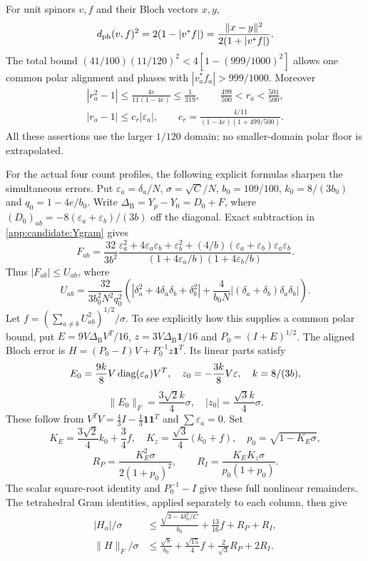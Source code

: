 For unit spinors $v,f$ and their Bloch vectors $x,y$,
\begin{equation}\label{app:candidate:spinor}
 d_{\rm ph}(v,f)^2=2(1-|v^*f|)
 =\frac{\|x-y\|^2}{2(1+|v^*f|)}.
\end{equation}
The total bound $(41/100)(11/120)^2<4[1-(999/1000)^2]$ allows one
common polar alignment and phases with $|v_a^*f_a|>999/1000$.
Moreover
\begin{gather*}
 |r_a^2-1|\le\frac{4e}{11(1-4e)}\le\frac1{319},\qquad
 \frac{499}{500}<r_a<\frac{501}{500},\\
 |r_a-1|\le c_r|\varepsilon_a|,
 \qquad c_r=\frac{4/11}{(1-4e)(1+499/500)}.
\end{gather*}
All these assertions use the larger $1/120$ domain; no smaller-domain
polar floor is extrapolated.

For the actual four count profiles, the following explicit formulas
sharpen the simultaneous errors. Put $\varepsilon_a=\delta_a/N$,
$\sigma=\sqrt C/N$, $b_0=109/100$, $k_0=8/(3b_0)$ and
$q_0=1-4e/b_0$. Write $\Delta_{\mathrm B}=Y_p-Y_0=D_0+F$, where
$(D_0)_{ab}=-8(\varepsilon_a+\varepsilon_b)/(3b)$ off the diagonal.
Exact subtraction in \eqref{app:candidate:Ygram} gives
\[
 F_{ab}=\frac{32}{3b^2}
 \frac{\varepsilon_a^2+4\varepsilon_a\varepsilon_b+\varepsilon_b^2
 +(4/b)(\varepsilon_a+\varepsilon_b)\varepsilon_a\varepsilon_b}
 {(1+4\varepsilon_a/b)(1+4\varepsilon_b/b)}.
\]
Thus $|F_{ab}|\le U_{ab}$, where
\[
 U_{ab}=\frac{32}{3b_0^2N^2q_0^2}
 \left(|\delta_a^2+4\delta_a\delta_b+\delta_b^2|
       +\frac4{b_0N}|(\delta_a+\delta_b)\delta_a\delta_b|\right).
\]
Let $f=(\sum_{a\ne b}U_{ab}^2)^{1/2}/\sigma$.
To see explicitly how this supplies a common polar bound, put
$E=9V\Delta_{\mathrm B}V^T/16$, $z=3V\Delta_{\mathrm B}\mathbf1/16$ and $P_0=(I+E)^{1/2}$.
The aligned Bloch error is
$H=(P_0-I)V+P_0^{-1}z\mathbf1^T$. Its linear parts satisfy
\[
 E_0=\frac{9k}{8}V\operatorname{diag}(\varepsilon_a)V^T,\quad
 z_0=-\frac{3k}{8}V\varepsilon,\quad k=8/(3b),
\]
\[
 \|E_0\|_F=\frac{3\sqrt2 k}{4}\sigma,
 \quad |z_0|=\frac{\sqrt3 k}{4}\sigma.
\]
These follow from $V^TV=\frac43I-\frac13\mathbf1\mathbf1^T$ and
$\sum\varepsilon_a=0$. Set
\[
 K_E=\frac{3\sqrt2}{4}k_0+\frac34f,\quad
 K_z=\frac{\sqrt3}{4}(k_0+f),\quad p_0=\sqrt{1-K_E\sigma},
\]
\[
 R_P=\frac{K_E^2\sigma}{2(1+p_0)^2},\qquad
 R_I=\frac{K_EK_z\sigma}{p_0(1+p_0)}.
\]
The scalar square-root identity and $P_0^{-1}-I$ give these full
nonlinear remainders. The tetrahedral Gram identities, applied separately
to each column, then give
\begin{align*}
 |H_a|/\sigma&\le\frac{\sqrt{3-4\delta_a^2/C}}{b_0}
                          +\frac{13}{16}f+R_P+R_I,\\
 \|H\|_F/\sigma&\le\frac{\sqrt8}{b_0}
                       +\frac{\sqrt{15}}4f+\frac2{\sqrt3}R_P+2R_I.
\end{align*}
